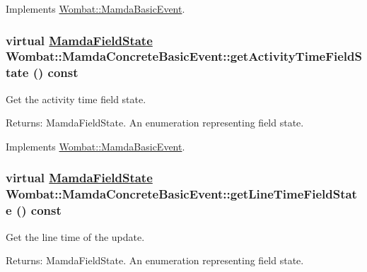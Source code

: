 Implements \hyperlink{classWombat_1_1MamdaBasicEvent_9cd58f3d7b5ebea42fa86e5dde46ab18}{Wombat::Mamda\-Basic\-Event}.\hypertarget{classWombat_1_1MamdaConcreteBasicEvent_d2ffaf16878c95e6740e7b3f77f1bb4e}{
\subsubsection[getActivityTimeFieldState]{\setlength{\rightskip}{0pt plus 5cm}virtual \hyperlink{namespaceWombat_93aac974f2ab713554fd12a1fa3b7d2a}{Mamda\-Field\-State} Wombat::Mamda\-Concrete\-Basic\-Event::get\-Activity\-Time\-Field\-State () const}}
\label{classWombat_1_1MamdaConcreteBasicEvent_d2ffaf16878c95e6740e7b3f77f1bb4e}


Get the activity time field state. 

\begin{Desc}
\item[Returns:]Mamda\-Field\-State. An enumeration representing field state. \end{Desc}


Implements \hyperlink{classWombat_1_1MamdaBasicEvent_a61a566e3442181ca1fadc4524296cd0}{Wombat::Mamda\-Basic\-Event}.\hypertarget{classWombat_1_1MamdaConcreteBasicEvent_8f501fe426d7cff7486834d8fbafa2d6}{
\subsubsection[getLineTimeFieldState]{\setlength{\rightskip}{0pt plus 5cm}virtual \hyperlink{namespaceWombat_93aac974f2ab713554fd12a1fa3b7d2a}{Mamda\-Field\-State} Wombat::Mamda\-Concrete\-Basic\-Event::get\-Line\-Time\-Field\-State () const}}
\label{classWombat_1_1MamdaConcreteBasicEvent_8f501fe426d7cff7486834d8fbafa2d6}


Get the line time of the update. 

\begin{Desc}
\item[Returns:]Mamda\-Field\-State. An enumeration representing field state. \end{Desc}


